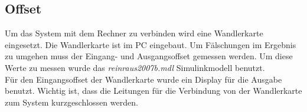 \subsection{Offset}
Um das System mit dem Rechner zu verbinden wird eine Wandlerkarte eingesetzt. Die Wandlerkarte ist im PC eingebaut. Um Fälschungen im Ergebnis zu umgehen muss der Eingang- und Ausgangsoffset gemessen werden. Um diese Werte zu messen wurde das \textit{reinraus2007b.mdl} Simulinkmodell benutzt.\\

Für den Eingangsoffset der Wandlerkarte wurde ein Display für die Ausgabe benutzt. Wichtig ist, dass die Leitungen für die Verbindung von der Wandlerkarte zum System kurzgeschlossen werden. 





